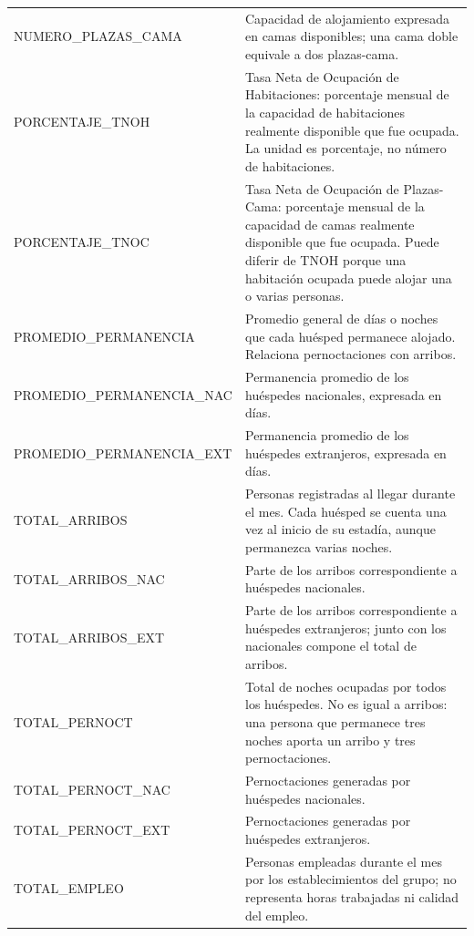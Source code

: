 \documentclass[10pt,a4paper]{article}
\theoremstyle{definition}
\begin{document}
\begin{longtable}{>{\ttfamily\raggedright\arraybackslash}p{}
                  >{\raggedright\arraybackslash}p{}}
NUMERO\_PLAZAS\_CAMA & Capacidad de alojamiento expresada en camas disponibles;
una cama doble equivale a dos plazas-cama. \\
PORCENTAJE\_TNOH & Tasa Neta de Ocupación de Habitaciones: porcentaje mensual
de la capacidad de habitaciones realmente disponible que fue ocupada. La
unidad es porcentaje, no número de habitaciones. \\
PORCENTAJE\_TNOC & Tasa Neta de Ocupación de Plazas-Cama: porcentaje mensual de
la capacidad de camas realmente disponible que fue ocupada. Puede diferir de
TNOH porque una habitación ocupada puede alojar una o varias personas. \\
PROMEDIO\_PERMANENCIA & Promedio general de días o noches que cada huésped
permanece alojado. Relaciona pernoctaciones con arribos. \\
PROMEDIO\_PERMANENCIA\_NAC & Permanencia promedio de los huéspedes nacionales,
expresada en días. \\
PROMEDIO\_PERMANENCIA\_EXT & Permanencia promedio de los huéspedes extranjeros,
expresada en días. \\
TOTAL\_ARRIBOS & Personas registradas al llegar durante el mes. Cada huésped se
cuenta una vez al inicio de su estadía, aunque permanezca varias noches. \\
TOTAL\_ARRIBOS\_NAC & Parte de los arribos correspondiente a huéspedes
nacionales. \\
TOTAL\_ARRIBOS\_EXT & Parte de los arribos correspondiente a huéspedes
extranjeros; junto con los nacionales compone el total de arribos. \\
TOTAL\_PERNOCT & Total de noches ocupadas por todos los huéspedes. No es igual a
arribos: una persona que permanece tres noches aporta un arribo y tres
pernoctaciones. \\
TOTAL\_PERNOCT\_NAC & Pernoctaciones generadas por huéspedes nacionales. \\
TOTAL\_PERNOCT\_EXT & Pernoctaciones generadas por huéspedes extranjeros. \\
TOTAL\_EMPLEO & Personas empleadas durante el mes por los establecimientos del
grupo; no representa horas trabajadas ni calidad del empleo. \\
\end{longtable}
\normalsize
\end{document}
